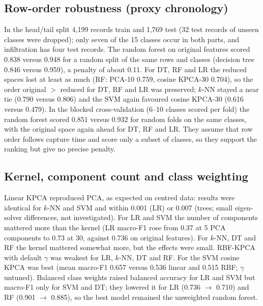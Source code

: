 \documentclass[runningheads]{llncs}
\begin{document}
\subsection{Row-order robustness (proxy chronology)}
In the head/tail split 4{,}199 records train and 1{,}769 test (32 test records of unseen classes were dropped); only seven of the 15 classes occur in both parts, and infiltration has four test records. The random forest on original features scored 0.838 versus 0.948 for a random split of the same rows and classes (decision tree 0.846 versus 0.959), a penalty of about 0.11. For DT, RF and LR the reduced spaces lost at least as much (RF: PCA-10 0.759, cosine KPCA-30 0.704), so the order original $>$ reduced for DT, RF and LR was preserved; $k$-NN stayed a near tie (0.790 versus 0.806) and the SVM again favoured cosine KPCA-30 (0.616 versus 0.479). In the blocked cross-validation (6--10 classes scored per fold) the random forest scored 0.851 versus 0.932 for random folds on the same classes, with the original space again ahead for DT, RF and LR. They assume that row order follows capture time and score only a subset of classes, so they support the ranking but give no precise penalty.





\subsection{Kernel, component count and class weighting}
Linear KPCA reproduced PCA, as expected on centred data: results were identical for $k$-NN and SVM and within 0.001 (LR) or 0.007 (trees; small eigen-solver differences, not investigated). For LR and SVM the number of components mattered more than the kernel (LR macro-F1 rose from 0.37 at 5 PCA components to 0.73 at 30, against 0.736 on original features). For $k$-NN, DT and RF the kernel mattered somewhat more, but the effects were small. RBF-KPCA with default $\gamma$ was weakest for LR, $k$-NN, DT and RF. For the SVM cosine KPCA was best (mean macro-F1 0.657 versus 0.536 linear and 0.515 RBF; $\gamma$ untuned). Balanced class weights raised balanced accuracy for LR and SVM but macro-F1 only for SVM and DT; they lowered it for LR (0.736 $\to$ 0.710) and RF (0.901 $\to$ 0.885), so the best model remained the unweighted random forest.
\end{document}
